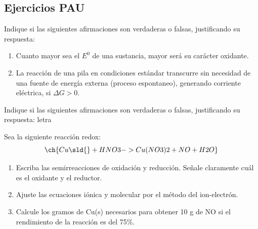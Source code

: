 \subsection{Ejercicios PAU}
\begin{exerciseEVAU}
    Indique si las siguientes afirmaciones son verdaderas o falsas, justificando su
respuesta:
\begin{enumerate}[label=\letraminuscula]
    \item Cuanto mayor sea el \( E^0 \) de una sustancia, mayor será su carácter oxidante.
    \item La reacción de una pila en condiciones estándar transcurre sin necesidad de una fuente
de energía externa (proceso espontaneo), generando corriente eléctrica, si \( \Delta G > 0 \).
\end{enumerate}
\begin{solu}
    Indique si las siguientes afirmaciones son verdaderas o falsas, justificando su
respuesta:
letra
\end{solu}
\end{exerciseEVAU}
\begin{exerciseEVAU}
Sea la siguiente reacción redox:
\begin{equation*}
    \ch{Cu \sld{} + HNO3 -> Cu(NO3)2 + NO + H2O}
\end{equation*}
\begin{enumerate}[label=\letraminuscula]
    \item Escriba las semirreacciones de oxidación y reducción. Señale claramente cuál es el oxidante
y el reductor.
    \item  Ajuste las ecuaciones iónica y molecular por el método del ion-electrón.
    \item Calcule los gramos de Cu(s) necesarios para obtener 10 g de NO si el rendimiento de la
reacción es del 75\%.
\end{enumerate}
\begin{solu}

\end{solu}
\end{exerciseEVAU}

